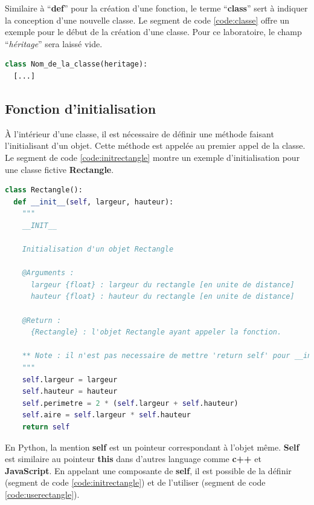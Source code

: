 \documentclass{article}
\begin{document}
\bigbreak
Similaire à ``\textbf{def}'' pour la création d'une fonction, le terme ``\textbf{class}'' sert à indiquer la conception d'une nouvelle classe. Le segment de code \ref{code:classe} offre un exemple pour le début de la création d'une classe.
\bigbreak
Pour ce laboratoire, le champ ``\textit{héritage}'' sera laissé vide.

\begin{lstlisting}[language=Python, caption={Création d'une classe en Python}, label={code:classe}]
class Nom_de_la_classe(heritage):
  [...]
\end{lstlisting}

\subsection{Fonction d'initialisation}
À l'intérieur d'une classe, il est nécessaire de définir une méthode faisant l'initialisant d'un objet. Cette méthode est appelée au premier appel de la classe. Le segment de code \ref{code:initrectangle} montre un exemple d'initialisation pour une classe fictive \textbf{Rectangle}.

\bigbreak
\begin{lstlisting}[language=Python, caption={Initilisation d'une classe d'un rectangle}, label={code:initrectangle}]
class Rectangle():
  def __init__(self, largeur, hauteur):
    """
    __INIT__

    Initialisation d'un objet Rectangle

    @Arguments :
      largeur {float} : largeur du rectangle [en unite de distance]
      hauteur {float} : hauteur du rectangle [en unite de distance]

    @Return :
      {Rectangle} : l'objet Rectangle ayant appeler la fonction.

    ** Note : il n'est pas necessaire de mettre 'return self' pour __init__
    """
    self.largeur = largeur
    self.hauteur = hauteur
    self.perimetre = 2 * (self.largeur + self.hauteur)
    self.aire = self.largeur * self.hauteur
    return self
\end{lstlisting}

En Python, la mention \textbf{self} est un pointeur correspondant à l'objet même. \textbf{Self} est similaire au pointeur \textbf{this} dans d'autres language comme \textbf{c++} et \textbf{JavaScript}. En appelant une composante de \textbf{self}, il est possible de la définir (segment de code \ref{code:initrectangle}) et de l'utiliser (segment de code \ref{code:userectangle}).
\end{document}
